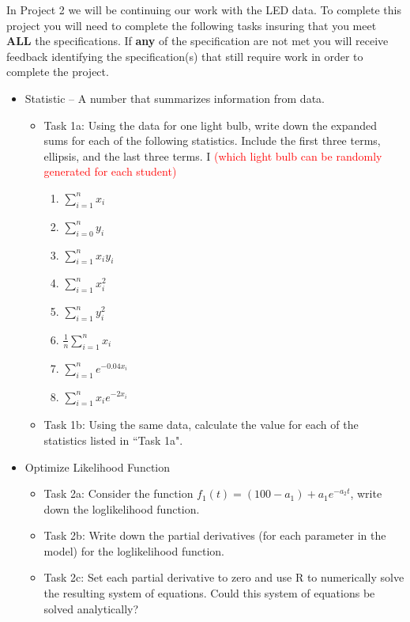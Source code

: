\documentclass{article}
\theoremstyle{plain}
\theoremstyle{box}
\begin{document}
In Project 2 we will be continuing our work with the LED data. To complete this project you will need to complete the following tasks insuring that you meet \textbf{ALL} the specifications. If \textbf{any} of the specification are not met you will receive feedback identifying the specification(s) that still require work in order to complete the project.

\begin{itemize}
\item Statistic  -- A number that summarizes information from data.
	\begin{itemize}
	\item Task 1a: Using the data for one light bulb, write down the expanded sums for each of the following statistics. Include the first three terms, ellipsis, and the last three terms. I  \textcolor{red}{(which light bulb can be randomly generated for each student)}
		\begin{enumerate}
		\item $\displaystyle \sum_{i=1}^{n} x_i$
		\item $\displaystyle \sum_{i=0}^{n} y_i$
		\item $\displaystyle \sum_{i=1}^{n} x_iy_i$
		\item $\displaystyle \sum_{i=1}^{n} x_i^2$
		\item $\displaystyle \sum_{i=1}^{n} y_i^2$
		\item $\displaystyle \frac{1}{n}\sum_{i=1}^{n} x_i$
		\item $\displaystyle \sum_{i=1}^{n} e^{-0.04x_i}$
		\item $\displaystyle \sum_{i=1}^{n} x_ie^{-2x_i}$
		\end{enumerate}
	\item Task 1b: Using the same data, calculate the value for each of the statistics listed in ``Task 1a".
	\end{itemize}
\item Optimize Likelihood Function
	\begin{itemize}
	\item Task 2a: Consider the function $f_1(t) = (100 - a_1) + a_1e^{-a_2t}$, write down the loglikelihood function.
	\item Task 2b: Write down the partial derivatives (for each parameter in the model) for the loglikelihood function.
	\item Task 2c: Set each partial derivative to zero and use R to numerically solve the resulting system of equations. Could this system of equations be solved analytically?

\end{itemize}
\end{itemize}
\end{document}
